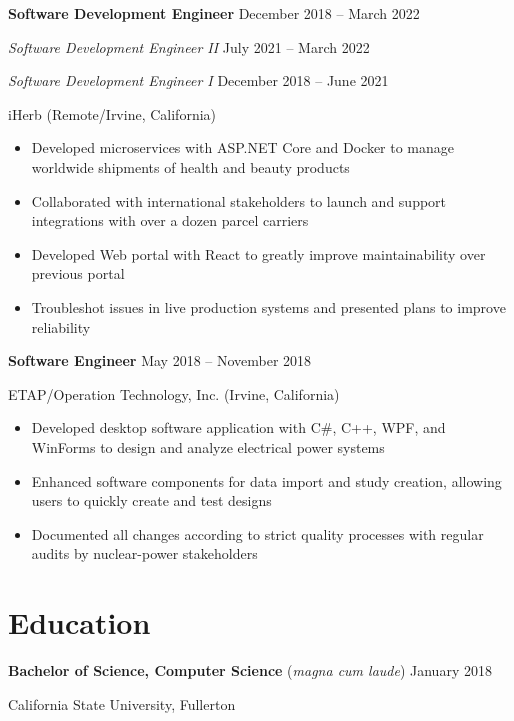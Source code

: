 \documentclass[11pt]{article}
\newcommand{\titleheader}[2]{\textbf{#1} \symbol{"B7} #2}
\newcommand{\titleextraheader}[3]{\textbf{#1} (#3) \symbol{"B7} #2}
\newcommand{\secondaryheader}[2]{\hspace{2.25em} \textit{#1} \symbol{"B7} #2}
\newcommand{\locheader}[2]{#1 (#2)}
\newcommand{\instheader}[1]{#1}
\begin{document}
	\titleheader{Software Development Engineer}{December 2018 -- March 2022}

	\secondaryheader{Software Development Engineer II}{July 2021 -- March 2022}

	\secondaryheader{Software Development Engineer I}{December 2018 -- June 2021}

	\locheader{iHerb}{Remote/Irvine, California}

	\begin{itemize}
		\item Developed microservices with ASP.NET Core and Docker to manage worldwide shipments of health and beauty products
		\item Collaborated with international stakeholders to launch and support integrations with over a dozen parcel carriers
		\item Developed Web portal with React to greatly improve maintainability over previous portal
		\item Troubleshot issues in live production systems and presented plans to improve reliability
	\end{itemize}

	\titleheader{Software Engineer}{May 2018 -- November 2018}

	\locheader{ETAP/Operation Technology, Inc.}{Irvine, California}

	\begin{itemize}
		\item Developed desktop software application with C\#, C++, WPF, and WinForms to design and analyze electrical power systems
		\item Enhanced software components for data import and study creation, allowing users to quickly create and test designs
		\item Documented all changes according to strict quality processes with regular audits by nuclear-power stakeholders
	\end{itemize}

	\section*{Education}

	\titleextraheader{Bachelor of Science, Computer Science}{January 2018}{\textit{magna cum laude}}

	\instheader{California State University, Fullerton}
\end{document}
